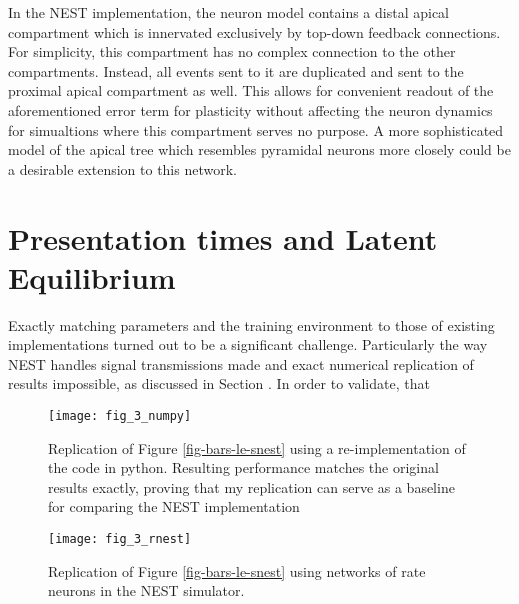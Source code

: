 In the NEST implementation, the neuron model contains a distal apical compartment which is innervated exclusively by top-down
feedback connections. For simplicity, this compartment has no complex connection to the other compartments. Instead,
all events sent to it are duplicated and sent to the proximal apical compartment as well. This allows for convenient 
readout of the aforementioned error term for plasticity without affecting the neuron dynamics for simualtions where 
this compartment serves no purpose. A more sophisticated model of the apical tree which resembles pyramidal neurons more
closely could be a desirable extension to this network.

\section{Presentation times and Latent Equilibrium}\label{sec-appendix-t-pres}

Exactly matching parameters and the training environment to those of existing implementations turned out to be a
significant challenge. Particularly the way NEST handles signal transmissions made and exact numerical replication of
results impossible, as discussed in Section . In order to validate, that



\begin{figure}
    \centering
    \texttt{[image: fig\_3\_numpy]}
    \caption{Replication of Figure \ref{fig-bars-le-snest} using a re-implementation of the \cite{Haider2021} code in
        python. Resulting performance matches the original results exactly, proving that my replication can serve as a
        baseline for comparing the NEST implementation}
    \label{fig-bars-le-numpy}
\end{figure}


\begin{figure}
    \centering
    \texttt{[image: fig\_3\_rnest]}
    \caption{Replication of Figure \ref{fig-bars-le-snest} using networks of rate neurons in the NEST simulator.}
    \label{fig-bars-le-rnest}
\end{figure}


